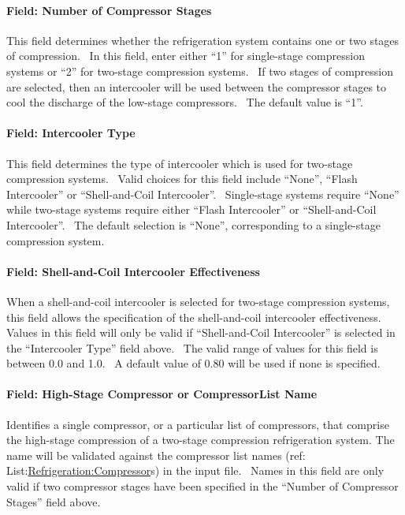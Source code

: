\paragraph{Field: Number of Compressor Stages}\label{field-number-of-compressor-stages}

This field determines whether the refrigeration system contains one or two stages of compression.~ In this field, enter either ``1'' for single-stage compression systems or ``2'' for two-stage compression systems.~ If two stages of compression are selected, then an intercooler will be used between the compressor stages to cool the discharge of the low-stage compressors.~ The default value is ``1''.

\paragraph{Field: Intercooler Type}\label{field-intercooler-type}

This field determines the type of intercooler which is used for two-stage compression systems.~ Valid choices for this field include ``None'', ``Flash Intercooler'' or ``Shell-and-Coil Intercooler''.~ Single-stage systems require ``None'' while two-stage systems require either ``Flash Intercooler'' or ``Shell-and-Coil Intercooler''.~ The default selection is ``None'', corresponding to a single-stage compression system.

\paragraph{Field: Shell-and-Coil Intercooler Effectiveness}\label{field-shell-and-coil-intercooler-effectiveness}

When a shell-and-coil intercooler is selected for two-stage compression systems, this field allows the specification of the shell-and-coil intercooler effectiveness.~ Values in this field will only be valid if ``Shell-and-Coil Intercooler'' is selected in the ``Intercooler Type'' field above.~ The valid range of values for this field is between 0.0 and 1.0.~ A default value of 0.80 will be used if none is specified.

\paragraph{Field: High-Stage Compressor or CompressorList Name}\label{field-high-stage-compressor-or-compressorlist-name}

Identifies a single compressor, or a particular list of compressors, that comprise the high-stage compression of a two-stage compression refrigeration system. The name will be validated against the compressor list names (ref: List:\hyperref[refrigerationcompressor]{Refrigeration:Compressor}s) in the input file.~ Names in this field are only valid if two compressor stages have been specified in the ``Number of Compressor Stages'' field above.

